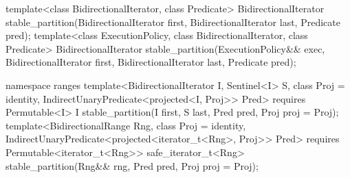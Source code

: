 %
\begin{itemdecl}
template<class BidirectionalIterator, class Predicate>
  BidirectionalIterator
    stable_partition(BidirectionalIterator first, BidirectionalIterator last, Predicate pred);
template<class ExecutionPolicy, class BidirectionalIterator, class Predicate>
  BidirectionalIterator
    stable_partition(ExecutionPolicy&& exec,
                     BidirectionalIterator first, BidirectionalIterator last, Predicate pred);
\end{itemdecl}
\begin{addedblock}
\begin{itemdecl}
namespace ranges {
  template<BidirectionalIterator I, Sentinel<I> S, class Proj = identity,
      IndirectUnaryPredicate<projected<I, Proj>> Pred>
    requires Permutable<I>
    I stable_partition(I first, S last, Pred pred, Proj proj = Proj{});
  template<BidirectionalRange Rng, class Proj = identity,
      IndirectUnaryPredicate<projected<iterator_t<Rng>, Proj>> Pred>
    requires Permutable<iterator_t<Rng>>
    safe_iterator_t<Rng> stable_partition(Rng&& rng, Pred pred, Proj proj = Proj{});
}
\end{itemdecl}
\end{addedblock}

